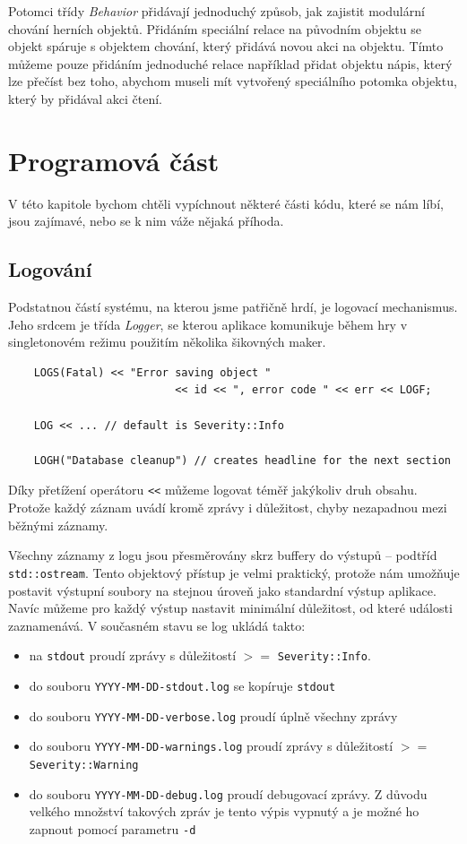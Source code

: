 \documentclass[11pt, a4paper]{article}
\def\class#1{\emph{#1}}
\begin{document}
Potomci třídy \class{Behavior} přidávají jednoduchý způsob, jak zajistit modulární chování herních objektů. Přidáním speciální relace na původním objektu se objekt spáruje s objektem chování, který přidává novou akci na objektu. Tímto můžeme pouze přidáním jednoduché relace například přidat objektu nápis, který lze přečíst bez toho, abychom museli mít vytvořený speciálního potomka objektu, který by přidával akci čtení.

\section{Programová část}

V této kapitole bychom chtěli vypíchnout některé části kódu, které se nám líbí, jsou zajímavé, nebo se k nim váže nějaká příhoda.

\subsection{Logování}

Podstatnou částí systému, na kterou jsme patřičně hrdí, je logovací mechanismus. Jeho srdcem je třída \class{Logger}, se kterou aplikace komunikuje během hry v singletonovém režimu použitím několika šikovných maker.

\begin{lstlisting}
	LOGS(Fatal) << "Error saving object "
	                      << id << ", error code " << err << LOGF;
	                      
    LOG << ... // default is Severity::Info
    
    LOGH("Database cleanup") // creates headline for the next section
\end{lstlisting} 

\noindent
Díky přetížení operátoru \texttt{<<} můžeme logovat téměř jakýkoliv druh obsahu. Protože každý záznam uvádí kromě zprávy i důležitost, chyby nezapadnou mezi běžnými záznamy.

Všechny záznamy z logu jsou přesměrovány skrz buffery do výstupů – podtříd \texttt{std::ostream}. Tento objektový přístup je velmi praktický, protože nám umožňuje postavit výstupní soubory na stejnou úroveň jako standardní výstup aplikace. Navíc můžeme pro každý výstup nastavit minimální důležitost, od které události zaznamenává. V současném stavu se log ukládá takto:

\begin{itemize}
\item na \texttt{stdout} proudí zprávy s důležitostí $>=$ \texttt{Severity::Info}.
\item do souboru \texttt{YYYY-MM-DD-stdout.log} se kopíruje \texttt{stdout}
\item do souboru \texttt{YYYY-MM-DD-verbose.log} proudí úplně všechny zprávy
\item do souboru \texttt{YYYY-MM-DD-warnings.log} proudí zprávy s důležitostí $>=$ \texttt{Severity::Warning}
\item do souboru \texttt{YYYY-MM-DD-debug.log} proudí debugovací zprávy. Z důvodu velkého množství takových zpráv je tento výpis vypnutý a je možné ho zapnout pomocí parametru \texttt{-d}
\end{itemize}
\end{document}
